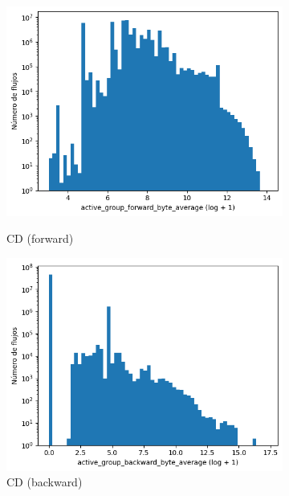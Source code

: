 \begin{figure}[H]
    \centering
    \begin{subfigure}[b]{0.26\textwidth}
        \centering
        \includegraphics[width=\textwidth]{media/packet_pincer_cicddos/active_group_forward_byte_average_log_x_log_y.png}
        \caption{CD (forward)}
        \includegraphics[width=\textwidth]{media/packet_pincer_cicddos/active_group_backward_byte_average_log_x_log_y.png}
        \caption{CD (backward)}
    \end{subfigure}
    \hfill
    \begin{subfigure}[b]{0.26\textwidth}
        \centering

\end{subfigure}
\end{figure}
